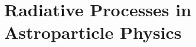 \documentclass[letterpaper, 11pt, notitlepage]{report}
\begin{document}
\newpage

\tableofcontents\label{sec:contents}

\chapter{Radiative Processes in Astroparticle Physics}


\newpage

%
%
%
%
%
%
%
%
%
%
%
%
%
%
%
%
%
%
%

\end{document}
